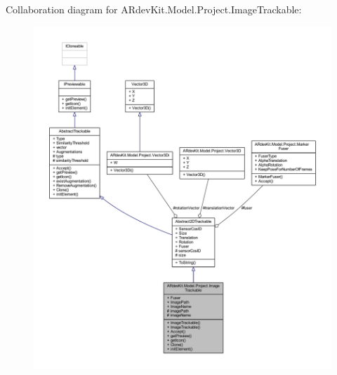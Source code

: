 Collaboration diagram for A\-Rdev\-Kit.\-Model.\-Project.\-Image\-Trackable\-:
\nopagebreak
\begin{figure}[H]
\begin{center}
\leavevmode
\includegraphics[width=350pt]{class_a_rdev_kit_1_1_model_1_1_project_1_1_image_trackable__coll__graph}
\end{center}
\end{figure}
